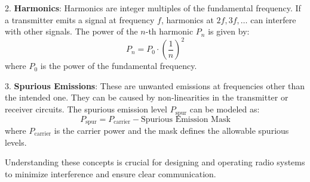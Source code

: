 2. \textbf{Harmonics}: Harmonics are integer multiples of the fundamental frequency. If a transmitter emits a signal at frequency \( f \), harmonics at \( 2f, 3f, \dots \) can interfere with other signals. The power of the \( n \)-th harmonic \( P_n \) is given by:
   \[
   P_n = P_0 \cdot \left( \frac{1}{n} \right)^2
   \]
   where \( P_0 \) is the power of the fundamental frequency.

3. \textbf{Spurious Emissions}: These are unwanted emissions at frequencies other than the intended one. They can be caused by non-linearities in the transmitter or receiver circuits. The spurious emission level \( P_{\text{spur}} \) can be modeled as:
   \[
   P_{\text{spur}} = P_{\text{carrier}} - \text{Spurious Emission Mask}
   \]
   where \( P_{\text{carrier}} \) is the carrier power and the mask defines the allowable spurious levels.

Understanding these concepts is crucial for designing and operating radio systems to minimize interference and ensure clear communication.

